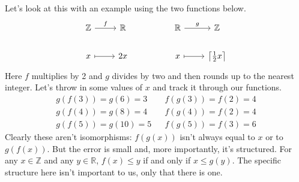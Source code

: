 \documentclass[12pt]{article}
\newcounter{examp}
\begin{document}
Let's look at this with an example using the two functions below.
\[\begin{tikzcd}
        {\mathbb{Z}} & {\mathbb{R}} && {\mathbb{R}} & {\mathbb{Z}} \\
        x & 2x && x & {\big\lceil \frac{1}{2}x \big\rceil}
        \arrow["f", from=1-1, to=1-2]
        \arrow[maps to, from=2-1, to=2-2]
        \arrow["g", from=1-4, to=1-5]
        \arrow[maps to, from=2-4, to=2-5]
    \end{tikzcd}\]
Here $f$ multiplies by 2 and $g$ divides by two and then rounds up to the nearest integer.
Let's throw in some values of $x$ and track it through our functions.
\begin{align*}
    g(f(3))=g(6)=3  &  & f(g(3))=f(2)=4 \\
    g(f(4))=g(8)=4  &  & f(g(4))=f(2)=4 \\
    g(f(5))=g(10)=5 &  & f(g(5))=f(3)=6
\end{align*}
Clearly these aren't isomorphisms: $f(g(x))$ isn't always equal to $x$ or to $g(f(x))$.
But the error is small and, more importantly, it's structured.
For any $x\in\mathbb{Z}$ and any $y\in\mathbb{R}$, $f(x) \le y$ if and only if $x \le g(y)$.
The specific structure here isn't important to us, only that there is one.
\end{document}
